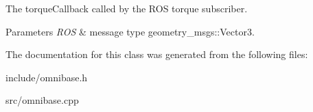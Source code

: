 The torque\-Callback called by the R\-O\-S torque subscriber. 


\begin{DoxyParams}{Parameters}
{\em R\-O\-S} & message type geometry\-\_\-msgs\-::\-Vector3. \\
\hline
\end{DoxyParams}


The documentation for this class was generated from the following files\-:\begin{DoxyCompactItemize}
\item 
include/omnibase.\-h\item 
src/omnibase.\-cpp\end{DoxyCompactItemize}
